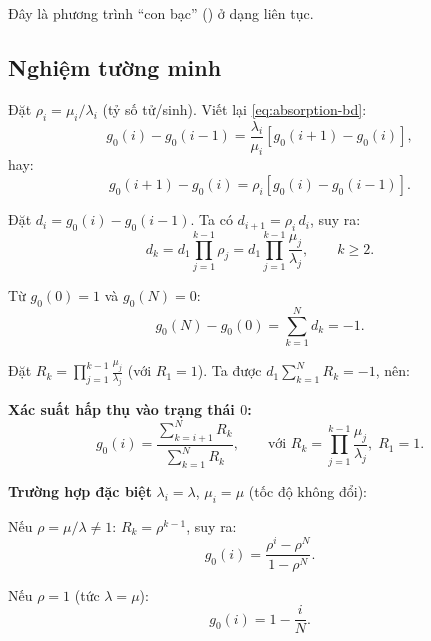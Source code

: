 Đây là phương trình ``con bạc'' () ở dạng liên tục.

\subsection{Nghiệm tường minh}

Đặt $\rho_i = \mu_i / \lambda_i$ (tỷ số tử/sinh). Viết lại \eqref{eq:absorption-bd}:
\[
  g_0(i) - g_0(i-1) = \frac{\lambda_i}{\mu_i}\left[g_0(i+1) - g_0(i)\right],
\]
hay:
\[
  g_0(i+1) - g_0(i) = \rho_i \left[g_0(i) - g_0(i-1)\right].
\]

Đặt $d_i = g_0(i) - g_0(i-1)$. Ta có $d_{i+1} = \rho_i\, d_i$, suy ra:
\[
  d_k = d_1 \prod_{j=1}^{k-1} \rho_j = d_1 \prod_{j=1}^{k-1} \frac{\mu_j}{\lambda_j}, \qquad k \geq 2.
\]

Từ $g_0(0) = 1$ và $g_0(N) = 0$:
\[
  g_0(N) - g_0(0) = \sum_{k=1}^{N} d_k = -1.
\]

Đặt $R_k = \prod_{j=1}^{k-1} \frac{\mu_j}{\lambda_j}$ (với $R_1 = 1$). Ta được $d_1 \sum_{k=1}^{N} R_k = -1$, nên:

\begin{congthuc}
\textbf{Xác suất hấp thụ vào trạng thái $0$:}
\begin{equation}\label{eq:absorption-formula}
  g_0(i) = \frac{\displaystyle\sum_{k=i+1}^{N} R_k}{\displaystyle\sum_{k=1}^{N} R_k},
  \qquad \text{với } R_k = \prod_{j=1}^{k-1} \frac{\mu_j}{\lambda_j},\; R_1 = 1.
\end{equation}
\end{congthuc}

\textbf{Trường hợp đặc biệt} $\lambda_i = \lambda$, $\mu_i = \mu$ (tốc độ không đổi):

Nếu $\rho = \mu/\lambda \neq 1$: $R_k = \rho^{k-1}$, suy ra:
\begin{equation}\label{eq:absorption-constant}
  g_0(i) = \frac{\rho^i - \rho^N}{1 - \rho^N}.
\end{equation}

Nếu $\rho = 1$ (tức $\lambda = \mu$):
\[
  g_0(i) = 1 - \frac{i}{N}.
\]

